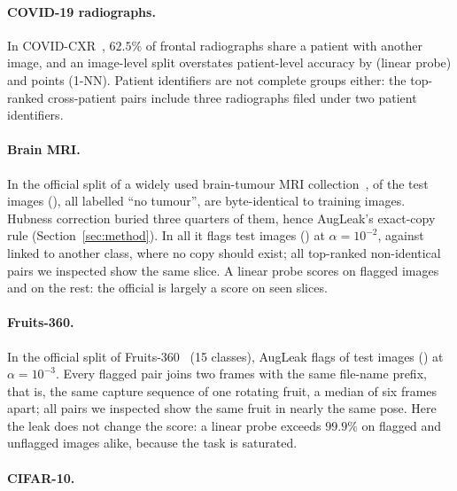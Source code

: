 \paragraph{COVID-19 radiographs.}
In COVID-CXR~\citep{cohen2020covid}, $62.5\%$ of frontal radiographs share a patient with another image, and an image-level split overstates patient-level accuracy by \numCovidLpGap{} (linear probe) and \numCovidKnnGap{} points (1-NN). Patient identifiers are not complete groups either: the top-ranked cross-patient pairs include three radiographs filed under two patient identifiers.

\paragraph{Brain MRI.}
In the official split of a widely used brain-tumour MRI collection~\citep{bhuvaji2020brain}, \numBTexact{} of the \numBTntest{} test images (\numBTexactPct{}), all labelled ``no tumour'', are byte-identical to training images. Hubness correction buried three quarters of them, hence AugLeak's exact-copy rule (Section~\ref{sec:method}). In all it flags \numBTflag{} test images (\numBTflagPct{}) at $\alpha=10^{-2}$, against \numBTcross{} linked to another class, where no copy should exist; all \numBTyes{} top-ranked non-identical pairs we inspected show the same slice. A linear probe scores \numBTaccFlag{} on flagged images and \numBTaccClean{} on the rest: the official \numBTaccAll{} is largely a score on seen slices.

\paragraph{Fruits-360.}
In the official split of Fruits-360~\citep{muresan2018fruits} (15 classes), AugLeak flags \numFRflag{} of \numFRntest{} test images (\numFRflagPct{}) at $\alpha=10^{-3}$. Every flagged pair joins two frames with the same file-name prefix, that is, the same capture sequence of one rotating fruit, a median of six frames apart; all \numFRyes{} pairs we inspected show the same fruit in nearly the same pose. Here the leak does not change the score: a linear probe exceeds $99.9\%$ on flagged and unflagged images alike, because the task is saturated.

\paragraph{CIFAR-10.}
\numCifarText{}
